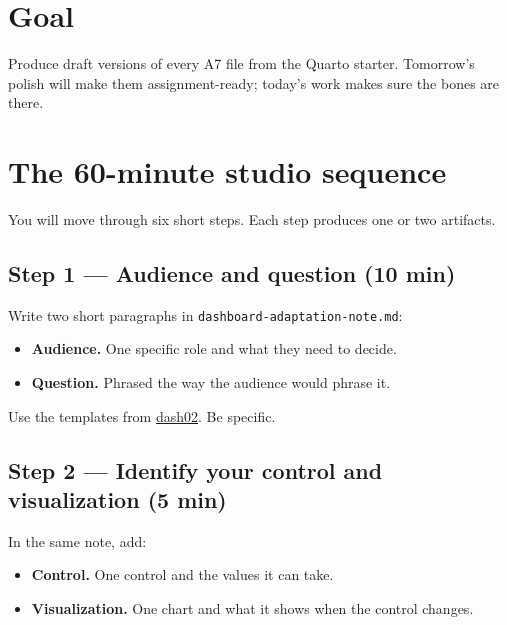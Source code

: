 \documentclass[
  letterpaper,
  DIV=11,
  numbers=noendperiod,
  oneside]{scrreprt}
\providecommand{\tightlist}{%
  \setlength{\itemsep}{0pt}\setlength{\parskip}{0pt}}
\begin{document}
\section*{Goal}\label{goal-9}


Produce draft versions of every A7 file from the Quarto starter.
Tomorrow's polish will make them assignment-ready; today's work makes
sure the bones are there.

\section*{The 60-minute studio
sequence}\label{the-60-minute-studio-sequence}


You will move through six short steps. Each step produces one or two
artifacts.

\subsection*{Step 1 --- Audience and question (10
min)}\label{step-1-audience-and-question-10-min}

Write two short paragraphs in \texttt{dashboard-adaptation-note.md}:

\begin{itemize}
\tightlist
\item
  \textbf{Audience.} One specific role and what they need to decide.
\item
  \textbf{Question.} Phrased the way the audience would phrase it.
\end{itemize}

Use the templates from
\hyperref[from-one-finding-to-a-prototype-the-1-1-1-1-1-rule]{dash02}.
Be specific.

\subsection*{Step 2 --- Identify your control and visualization (5
min)}\label{step-2-identify-your-control-and-visualization-5-min}

In the same note, add:

\begin{itemize}
\tightlist
\item
  \textbf{Control.} One control and the values it can take.
\item
  \textbf{Visualization.} One chart and what it shows when the control
  changes.
\end{itemize}
\end{document}
